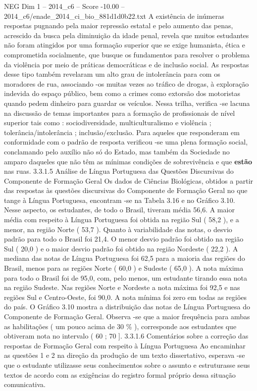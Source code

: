 \begin{textsample}{NEG Dim 1 – 2014\_c6 – Score -10.00 – 2014\_c6/enade\_2014\_ci\_bio\_881d1d0b22.txt}
A existência de inúmeras respostas pugnando pela maior repressão estatal e pelo aumento das penas, acrescido da busca pela diminuição da idade penal, revela que muitos estudantes não foram atingidos por uma formação superior que se exige humanista, ética e comprometida socialmente, que busque os fundamentos para resolver o problema da violência por meio de práticas democráticas e de inclusão social.
As respostas desse tipo também revelaram um alto grau de intolerância para com os moradores de rua, associando -os muitas vezes ao tráfico de drogas, à exploração indevida do espaço público, bem como a crimes como extorsão dos motoristas quando pedem dinheiro para guardar os veículos.
Nessa trilha, verifica -se lacuna na discussão de temas importantes para a formação de profissionais de nível superior tais como : sociodiversidade, multiculturalismo e violência ; tolerância/intolerância ; inclusão/exclusão.
Para aqueles que responderam em conformidade com o padrão de resposta verificou -se uma plena formação social, conclamando pelo auxílio não só do Estado, mas também da Sociedade no amparo daqueles que não têm as mínimas condições de sobrevivência e que \textbf{estão} nas ruas. 3.3.1.5 Análise de Língua Portuguesa das Questões Discursivas do Componente de Formação Geral Os dados de Ciências Biológicas, obtidos a partir das respostas às questões discursivas do Componente de Formação Geral no que tange à Língua Portuguesa, encontram -se na Tabela 3.16 e no Gráfico 3.10.
Nesse aspecto, os estudantes, de todo o Brasil, tiveram média 56,6.
A maior média com respeito à Língua Portuguesa foi obtida na região Sul ( 58,2 ), e a menor, na região Norte ( 53,7 ).
Quanto à variabilidade das notas, o desvio padrão para todo o Brasil foi 21,4.
O menor desvio padrão foi obtido na região Sul ( 20,0 ) e o maior desvio padrão foi obtido na região Nordeste ( 22,2 ).
A mediana das notas de Língua Portuguesa foi 62,5 para a maioria das regiões do Brasil, menos para as regiões Norte ( 60,0 ) e Sudeste ( 65,0 ).
A nota máxima para todo o Brasil foi de 95,0, com, pelo menos, um estudante tirando essa nota na região Sudeste.
Nas regiões Norte e Nordeste a nota máxima foi 92,5 e nas regiões Sul e Centro-Oeste, foi 90,0.
A nota mínima foi zero em todas as regiões do país.
O Gráfico 3.10 mostra a distribuição das notas de Língua Portuguesa do Componente de Formação Geral.
Observa -se que a maior frequência para ambas as habilitações ( um pouco acima de 30 \% ), corresponde aos estudantes que obtiveram nota no intervalo ( 60 ; 70 ]. 3.3.1.6 Comentários sobre a correção das respostas de Formação Geral com respeito à Língua Portuguesa Ao encaminhar as questões 1 e 2 na direção da produção de um texto dissertativo, esperava -se que o estudante utilizasse seus conhecimentos sobre o assunto e estruturasse seus textos de acordo com as exigências do registro formal próprio dessa situação comunicativa.

\end{textsample}
